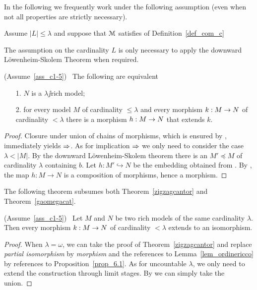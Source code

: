 \documentclass[creche.tex]{subfiles}
\begin{document}
In the following we frequently work under the following assumption (even when not all properties are strictly necessary).
 
\begin{assumption}\label{ass_c1-5}
Assume  $|L|\le\lambda$ and suppose that $\EuScript M$ satisfies  of Definition~\ref{def_com_c}
\end{assumption} 
 
The assumption on the cardinality $L$ is only necessary to apply the downward L\"owenheim-Skolem Theorem when required.

\begin{proposition}\label{prop_6.1}
(Assume~\ref{ass_c1-5})  \  The following are equivalent
\begin{itemize}
\item[1.] $N$ is a $\lambda\jj$rich model;
\item[2.] for every model $M$ of cardinality $\le\lambda$ and every morphism $k:M\rightarrow N$ of cardinality $<\lambda$ there is a morphism $h:M\rightarrow N$ that extends $k$.
\end{itemize}
\end{proposition}
\begin{proof}
Closure under union of chains of morphisms, which is ensured by , immediately yields $\Rightarrow$. As for implication $\Rightarrow$ we only need to consider the case $\lambda<|M|$.  By the downward L\"owenheim-Skolem theorem there is an  $M'\preceq M$ of cardinality $\lambda$ containing $b$. Let $h:M'\hookrightarrow N$ be the embedding obtained from . By , the map  $h:M\to N$ is a composition of morphisms, hence a morphism.
\end{proof}

The following theorem subsumes both Theorem~\ref{zigzagcantor} and Theorem~\ref{gaomegacat}.

\begin{theorem}\label{thm_riccozigzag}
(Assume~\ref{ass_c1-5})  \  Let $M$ and $N$ be two rich models of the same cardinality $\lambda$. Then every morphism $k:M\rightarrow N$ of cardinality $<\lambda$ extends to an isomorphism.
\end{theorem}

\begin{proof}
When $\lambda=\omega$, we can take the proof of Theorem~\ref{zigzagcantor} and replace \textit{partial isomorphism\/} by \textit{morphism\/} and the references to Lemma~\ref{lem_ordinericco} by references to Proposition~\ref{prop_6.1}. As for uncountable $\lambda$, we only need to extend the construction through limit stages. By  we can simply take the union.
\end{proof}
\end{document}
